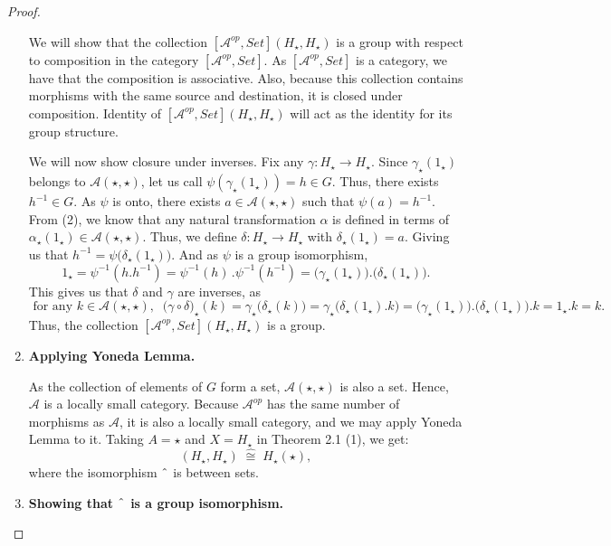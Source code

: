 \documentclass[a4paper]{article}
\theoremstyle{definition}
\begin{document}
\begin{proof}
\begin{enumerate}[label=\Roman*]
					We will show that the collection
					$[\mathcal{A} ^{op},Set](H_\star, H_\star)$
					is a group with respect to composition in the category
					$[\mathcal{A} ^{op},Set]$.
					As $[\mathcal{A} ^{op},Set]$ is a category, we have that
					the composition is associative. Also, because this collection contains
					morphisms with the same source and destination,
					it is closed under composition. Identity of
					$[ \mathcal{A} ^{op},Set ] (H_\star,H_\star)$ will act as
					the identity for its group structure.

					We will now show closure under inverses.
					Fix any $\gamma:H_\star \to H_\star$.
					Since $\gamma_\star(1_\star)$ belongs to
					$ \mathcal{A} (\star,\star)$,
					let us call $\psi(\gamma_\star(1_\star))=h \in G$. Thus,
					there exists $h^{-1}\in G$. As $\psi$ is onto,
					there exists $a\in \mathcal{A} (\star,\star)$ such that
					$\psi(a)=h^{-1}$.
					From (2), we know that any natural transformation $\alpha$
					is defined in terms of $\alpha_\star(1_\star) \in
					\mathcal{A}(\star,\star)$. Thus, we define
					$\delta:H_\star \to H_\star$ with $\delta_\star(1_\star)=a$.
					Giving us that
					$h^{-1}=\psi \big(\delta_\star(1_\star) \big) $.
						And as $\psi$ is a group isomorphism,
					\[ 1_\star = \psi^{-1}(h.h^{-1})=\psi^{-1}(h)\,. \psi^{-1}(h^{-1})
					=\big(\gamma_\star(1_\star)\big).\big(\delta_\star(1_\star)\big).\]
This gives us that $\delta$ and $\gamma$ are inverses, as
					\[ \text{ for any } k \in \mathcal{A} (\star,\star), \; \;
						\big( \gamma \circ \delta\big)_\star
						(k)
						= \gamma_\star\big(\delta_\star(k)\big)
						=\gamma_\star \big( \delta_\star(1_\star).k \big)
						=\big(\gamma_\star(1_\star)\big).
						\big( \delta_\star(1_\star) \big).k
					=1_\star.k=k.\]
					Thus, the collection $[ \mathcal{A} ^{op}, Set](H_\star,H_\star)$ is a group.

				\item \textbf{Applying Yoneda Lemma.}

					As the collection of elements of $G$ form a set, $\mathcal{A}(\star,\star)$
					is also a set. Hence, $\mathcal{A}$ is a locally small category. Because
					$\mathcal{A} ^{op}$ has the same number of morphisms as $\mathcal{A}$,
					it is also a locally small category, and we may apply Yoneda Lemma to it.
					Taking $A=\star$ and $X=H_\star$ in Theorem 2.1 (1), we get:
					\begin{equation} [ \mathcal{A} ^{op}, Set](H_\star,H_\star)
						\; \hat{\cong} \; H_\star(\star), \end{equation}
					where the isomorphism $\string ^$ is between sets.
				\item \textbf{Showing that $\string ^$ is a group isomorphism.}


\end{enumerate}
\end{proof}
\end{document}

